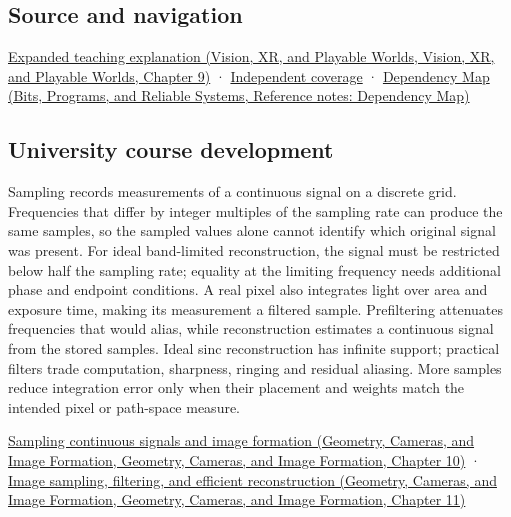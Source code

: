 \subsection{Source and navigation}\label{appendix-6a7869dd79a6-source-and-navigation}

\href{../07-Vision-XR-and-Playable-Worlds/main.pdf\#nameddest=04-visual-computing-ii-ch042-sampling-is-a-question-of-what-remains-distinguishable}{Expanded teaching explanation (Vision, XR, and Playable Worlds, Vision, XR, and Playable Worlds, Chapter 9)} · \hyperref[appendix-fd090d982a15-xr01---independent-seeing-and-representation-source]{Independent coverage} · \href{../01-Bits-Programs-and-Reliable-Systems/main.pdf\#nameddest=appendix-4ad47bdd269a}{Dependency Map (Bits, Programs, and Reliable Systems, Reference notes: Dependency Map)}

\subsection{University course development}\label{appendix-6a7869dd79a6-university-course-development}

Sampling records measurements of a continuous signal on a discrete grid. Frequencies that differ by integer multiples of the sampling rate can produce the same samples, so the sampled values alone cannot identify which original signal was present. For ideal band-limited reconstruction, the signal must be restricted below half the sampling rate; equality at the limiting frequency needs additional phase and endpoint conditions. A real pixel also integrates light over area and exposure time, making its measurement a filtered sample. Prefiltering attenuates frequencies that would alias, while reconstruction estimates a continuous signal from the stored samples. Ideal sinc reconstruction has infinite support; practical filters trade computation, sharpness, ringing and residual aliasing. More samples reduce integration error only when their placement and weights match the intended pixel or path-space measure.

\href{../03-Geometry-Cameras-and-Image-Formation/main.pdf\#nameddest=03-visual-computing-i-ch003-sampling-continuous-signals-and-image-formation}{Sampling continuous signals and image formation (Geometry, Cameras, and Image Formation, Geometry, Cameras, and Image Formation, Chapter 10)} · \href{../03-Geometry-Cameras-and-Image-Formation/main.pdf\#nameddest=03-visual-computing-i-ch004-image-sampling-filtering-and-efficient-reconstruction}{Image sampling, filtering, and efficient reconstruction (Geometry, Cameras, and Image Formation, Geometry, Cameras, and Image Formation, Chapter 11)}

